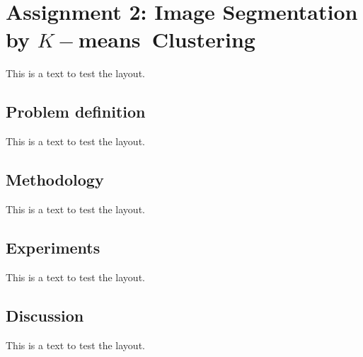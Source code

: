 \section{Assignment 2: Image Segmentation by \texorpdfstring{$K-$means}\ \ Clustering}
\label{sec:assignment2}

This is a text to test the layout.

\subsection{Problem definition}

This is a text to test the layout.

\subsection{Methodology}

This is a text to test the layout.

\subsection{Experiments}

This is a text to test the layout.

\subsection{Discussion}

This is a text to test the layout.

